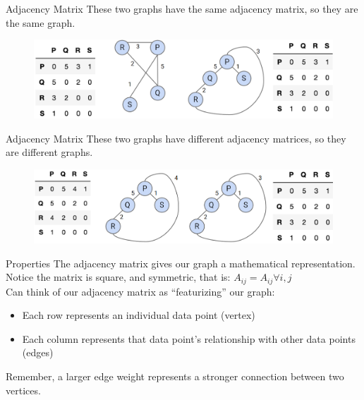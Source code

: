 \documentclass[aspectratio=169]{../latex_main/tntbeamer}  %
\begin{document}
	
	
	\begin{frame}{Adjacency Matrix}
	    These two graphs have the same adjacency matrix, so they are the same graph.
	    \begin{figure}
	        \centering
	        \includegraphics[scale=.4]{Bild13}
	    \end{figure}
	\end{frame}
	
	
	
	\begin{frame}{Adjacency Matrix}
	    These two graphs have different adjacency matrices, so they are different graphs.
	    \begin{figure}
	        \centering
	        \includegraphics[scale=.4]{Bild14}
	    \end{figure}
	\end{frame}
	
	
	
	\begin{frame}{Properties}
	    The adjacency matrix gives our graph a mathematical representation.\\
        Notice the matrix is square, and symmetric, that is: $A_{ij} = A_{ij}\forall i,j$\\
        \bigskip
        Can think of our adjacency matrix as “featurizing” our graph:\\
        \begin{itemize}
            \item  Each row represents an individual data point (vertex)
            \item Each column represents that data point’s relationship with other data points (edges)
        \end{itemize}
        \bigskip
        Remember, a larger edge weight represents a stronger connection between two vertices.
	\end{frame}
\end{document}
